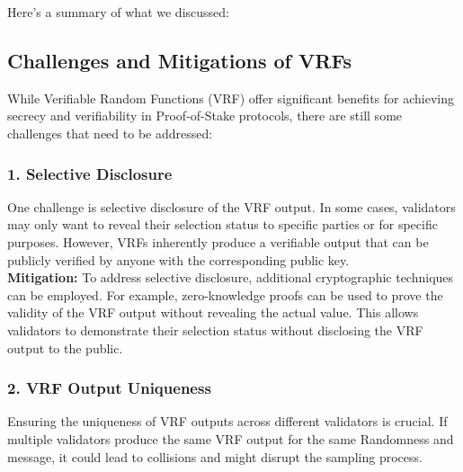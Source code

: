 Here's a summary of what we discussed:
\subsection{Challenges and Mitigations of VRFs}
While Verifiable Random Functions (VRF) offer significant benefits for achieving secrecy and verifiability in Proof-of-Stake protocols, there are still some challenges that need to be addressed:

\subsubsection{1. Selective Disclosure}
One challenge is selective disclosure of the VRF output. In some cases, validators may only want to reveal their selection status to specific parties or for specific purposes. However, VRFs inherently produce a verifiable output that can be publicly verified by anyone with the corresponding public key.\\

\noindent
\textbf{Mitigation:} To address selective disclosure, additional cryptographic techniques can be employed. For example, zero-knowledge proofs can be used to prove the validity of the VRF output without revealing the actual value. This allows validators to demonstrate their selection status without disclosing the VRF output to the public.

\subsubsection{2. VRF Output Uniqueness}
Ensuring the uniqueness of VRF outputs across different validators is crucial. If multiple validators produce the same VRF output for the same Randomness and message, it could lead to collisions and might disrupt the sampling process.\\

